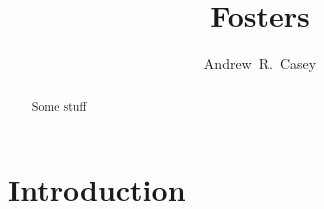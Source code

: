 \documentclass[preprint]{aastex}
\begin{document}
\title{Fosters}

\author{
  Andrew~R.~Casey
}


\begin{abstract}
  Some stuff
\end{abstract}




\section{Introduction} 
\label{sec:introduction}
\end{document}

